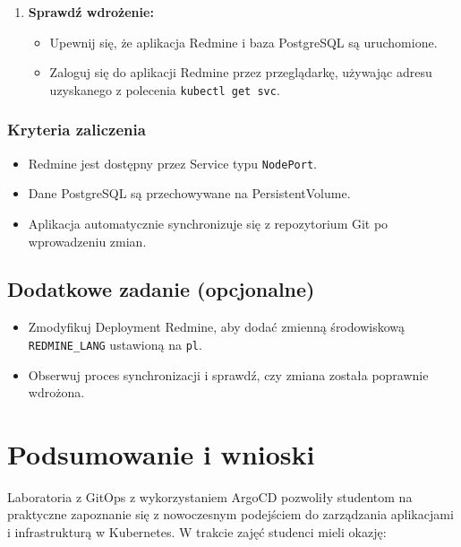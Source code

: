 \documentclass{article}
\begin{document}
\begin{enumerate}
    \item \textbf{Sprawdź wdrożenie:}
    \begin{itemize}
        \item Upewnij się, że aplikacja Redmine i baza PostgreSQL są uruchomione.
        \item Zaloguj się do aplikacji Redmine przez przeglądarkę, używając adresu uzyskanego z polecenia \texttt{kubectl get svc}.
    \end{itemize}
\end{enumerate}

\subsubsection{Kryteria zaliczenia}

\begin{itemize}
    \item Redmine jest dostępny przez Service typu \texttt{NodePort}.
    \item Dane PostgreSQL są przechowywane na PersistentVolume.
    \item Aplikacja automatycznie synchronizuje się z repozytorium Git po wprowadzeniu zmian.
\end{itemize}

\subsection{Dodatkowe zadanie (opcjonalne)}

\begin{itemize}
    \item Zmodyfikuj Deployment Redmine, aby dodać zmienną środowiskową \texttt{REDMINE\_LANG} ustawioną na \texttt{pl}.
    \item Obserwuj proces synchronizacji i sprawdź, czy zmiana została poprawnie wdrożona.
\end{itemize}

\section{Podsumowanie i wnioski}

Laboratoria z GitOps z wykorzystaniem ArgoCD pozwoliły studentom na praktyczne zapoznanie się z nowoczesnym podejściem do zarządzania aplikacjami i infrastrukturą w Kubernetes. W trakcie zajęć studenci mieli okazję:
\end{document}
